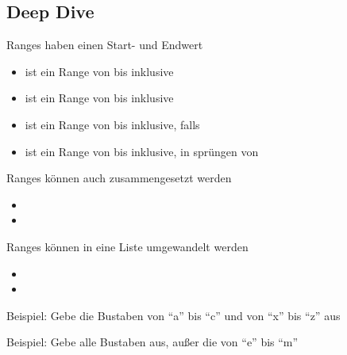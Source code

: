 \subsection{Deep Dive}
\begin{frame}
    \slidehead
    Ranges haben einen Start- und Endwert
    \begin{itemize}
        \item<1->  ist ein Range von  bis  inklusive
        \item<2->  ist ein Range von  bis  inklusive
        \item<3->  ist ein Range von  bis  inklusive, falls 
        \item<4->  ist ein Range von  bis  inklusive, in sprüngen von 
    \end{itemize}
    Ranges können auch zusammengesetzt werden
    \begin{itemize}
        \item<6-> 
        \item<7-> 
    \end{itemize}
    Ranges können in eine Liste umgewandelt werden
    \begin{itemize}
        \item<9-> 
        \item<9-> 
    \end{itemize}
\end{frame}

\begin{frame}
    \slidehead
    Beispiel: Gebe die Bustaben von \enquote{a} bis \enquote{c} und von \enquote{x} bis \enquote{z} aus
    \pause
\end{frame}

\begin{frame}
    \slidehead
    Beispiel: Gebe alle Bustaben aus, außer die von \enquote{e} bis \enquote{m}
    \pause
\end{frame}

\livecoding

